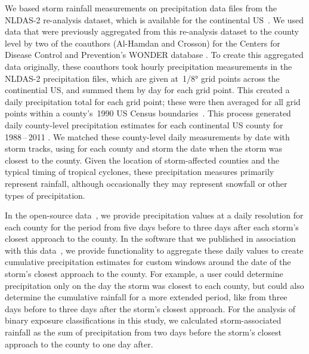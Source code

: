 We based storm rainfall measurements on precipitation data files from the
\ac{NLDAS-2} re-analysis dataset, which is available for the continental
\ac{US}~\parencite{rui2013nldas}. We used data that were previously aggregated
from this re-analysis dataset to the county level by two of the coauthors
(Al-Hamdan and Crosson) for the Centers for Disease Control and Prevention's
\ac{WONDER} database \parencite{cdcwonder, alhamdan2014environmental}. To
create this aggregated data originally, these coauthors took hourly
precipitation measurements in the \ac{NLDAS-2} precipitation files, which are
given at~1/8\si{\degree} grid points across the continential \ac{US}, and
summed them by day for each grid point.  This created a daily precipitation
total for each grid point; these were then averaged for all grid points within
a county's~1990 \ac{US} Census boundaries~\parencite{alhamdan2014environmental,
cdcwonder}. This process generated daily county-level precipitation estimates
for each continental \ac{US} county for 1988\,--\,2011 \parencite{cdcwonder}.
We matched these county-level daily measurements by date with storm tracks,
using for each county and storm the date when the storm was closest to the
county. Given the location of storm-affected counties and the typical timing of
tropical cyclones, these precipitation measures primarily represent rainfall,
although occasionally they may represent snowfall or other types of
precipitation.  

In the open-source data~\parencite{hurricaneexposuredata}, we provide
precipitation values at a daily resolution for each county for the period from
five days before to three days after each storm's closest approach to the
county.  In the software that we published in association with this
data~\parencite{hurricaneexposure}, we provide functionality to aggregate these
daily values to create cumulative precipitation estimates for custom windows
around the date of the storm's closest approach to the county. For example, a
user could determine precipitation only on the day the storm was closest to
each county, but could also determine the cumulative rainfall for a more
extended period, like from three days before to three days after the storm's
closest approach. For the analysis of binary exposure classifications in this
study, we calculated storm-associated rainfall as the sum of precipitation from
two days before the storm's closest approach to the county to one day after.  

